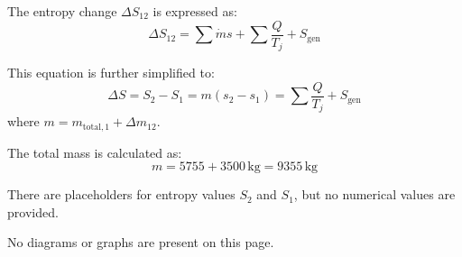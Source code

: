 The entropy change \( \Delta S_{12} \) is expressed as:  
\[
\Delta S_{12} = \sum \dot{m} s + \sum \frac{Q}{T_j} + S_{\text{gen}}
\]  

This equation is further simplified to:  
\[
\Delta S = S_2 - S_1 = m (s_2 - s_1) = \sum \frac{Q}{T_j} + S_{\text{gen}}
\]  
where \( m = m_{\text{total},1} + \Delta m_{12} \).  

The total mass is calculated as:  
\[
m = 5755 + 3500 \, \text{kg} = 9355 \, \text{kg}
\]  

There are placeholders for entropy values \( S_2 \) and \( S_1 \), but no numerical values are provided.  

No diagrams or graphs are present on this page.